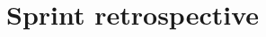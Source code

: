 \documentclass[a4paper,11pt]{article}
\begin{document}
%
%
%
%
%
%
%
%
%
%

\section{Sprint retrospective}
\end{document}
